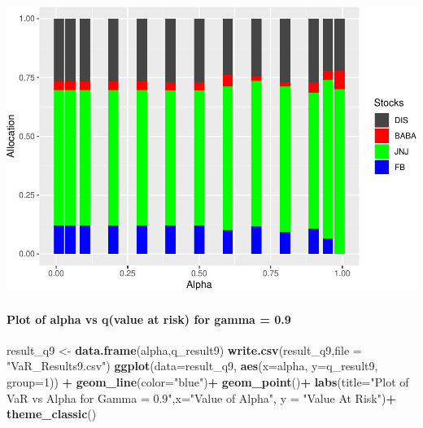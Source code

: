 \documentclass[]{article}
\newenvironment{Shaded}{\begin{snugshade}}{\end{snugshade}}
\newcommand{\KeywordTok}[1]{\textcolor[rgb]{0.13,0.29,0.53}{\textbf{#1}}}
\newcommand{\DataTypeTok}[1]{\textcolor[rgb]{0.13,0.29,0.53}{#1}}
\newcommand{\DecValTok}[1]{\textcolor[rgb]{0.00,0.00,0.81}{#1}}
\newcommand{\StringTok}[1]{\textcolor[rgb]{0.31,0.60,0.02}{#1}}
\newcommand{\OperatorTok}[1]{\textcolor[rgb]{0.81,0.36,0.00}{\textbf{#1}}}
\newcommand{\NormalTok}[1]{#1}
\let\oldparagraph\paragraph
\renewcommand{\paragraph}[1]{\oldparagraph{#1}\mbox{}}
\begin{document}
\includegraphics{Integrated_Management_Formulation_Model_files/figure-latex/unnamed-chunk-21-2.pdf}

\paragraph{Plot of alpha vs q(value at risk) for gamma =
0.9}\label{plot-of-alpha-vs-qvalue-at-risk-for-gamma-0.9}

\begin{Shaded}
\begin{Highlighting}[]
\NormalTok{result_q9 <-}\StringTok{ }\KeywordTok{data.frame}\NormalTok{(alpha,q_result9)}
\KeywordTok{write.csv}\NormalTok{(result_q9,}\DataTypeTok{file =} \StringTok{"VaR_Results9.csv"}\NormalTok{)}
\KeywordTok{ggplot}\NormalTok{(}\DataTypeTok{data=}\NormalTok{result_q9, }\KeywordTok{aes}\NormalTok{(}\DataTypeTok{x=}\NormalTok{alpha, }\DataTypeTok{y=}\NormalTok{q_result9, }\DataTypeTok{group=}\DecValTok{1}\NormalTok{)) }\OperatorTok{+}
\StringTok{  }\KeywordTok{geom_line}\NormalTok{(}\DataTypeTok{color=}\StringTok{"blue"}\NormalTok{)}\OperatorTok{+}
\StringTok{  }\KeywordTok{geom_point}\NormalTok{()}\OperatorTok{+}
\StringTok{  }\KeywordTok{labs}\NormalTok{(}\DataTypeTok{title=}\StringTok{"Plot of VaR vs Alpha for Gamma = 0.9"}\NormalTok{,}\DataTypeTok{x=}\StringTok{"Value of Alpha"}\NormalTok{, }\DataTypeTok{y =} \StringTok{"Value At Risk"}\NormalTok{)}\OperatorTok{+}
\StringTok{  }\KeywordTok{theme_classic}\NormalTok{()}
\end{Highlighting}
\end{Shaded}
\end{document}
